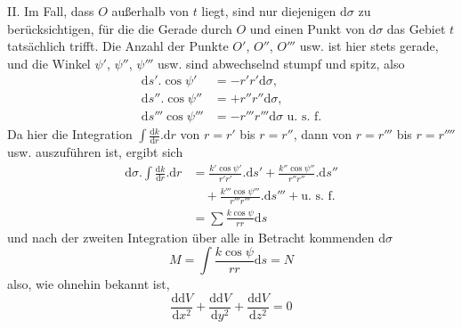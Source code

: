 II. Im Fall, dass $O$ außerhalb von $t$ liegt, sind nur diejenigen $\mathrm{d}\sigma$ zu berücksichtigen, für die die Gerade durch $O$ und einen Punkt von $\mathrm{d}\sigma$ das Gebiet $t$ tatsächlich trifft. Die Anzahl der Punkte $O'$, $O''$, $O'''$ usw. ist hier stets gerade, und die Winkel $\psi'$, $\psi''$, $\psi'''$ usw. sind abwechselnd stumpf und spitz, also
\[
\begin{aligned}
\mathrm{d}s'.\cos\psi'&=-r'r'\mathrm{d}\sigma,\\
\mathrm{d}s''.\cos\psi''&=+r''r''\mathrm{d}\sigma,\\
\mathrm{d}s'''\cos\psi'''&=-r'''r'''\mathrm{d}\sigma\text{ u. s. f.}
\end{aligned}
\]
Da hier die Integration $\int\frac{\mathrm{d}k}{\mathrm{d}r}.\mathrm{d}r$ von $r=r'$ bis $r=r''$, dann von $r=r'''$
%
bis $r=r''''$ usw. auszuführen ist, ergibt sich
\[
\begin{aligned}
\mathrm{d}\sigma.\int\frac{\mathrm{d}k}{\mathrm{d}r}.\mathrm{d}r&=\frac{k'\cos\psi'}{r'r'}.\mathrm{d}s'+\frac{k''\cos\psi''}{r''r''}.\mathrm{d}s''\\
&\quad{}+\frac{k'''\cos\psi'''}{r'''r'''}.\mathrm{d}s'''+\text{u. s. f.}\\
&=\sum\frac{k\cos\psi}{rr}\mathrm{d}s
\end{aligned}
\]
und nach der zweiten Integration über alle in Betracht kommenden $\mathrm{d}\sigma$
\[
M=\int\frac{k\cos\psi}{rr}\mathrm{d}s=N
\]
also, wie ohnehin bekannt ist,
\[
\frac{\mathrm{d}\mathrm{d}V}{\mathrm{d}x^2}+\frac{\mathrm{d}\mathrm{d}V}{\mathrm{d}y^2}+\frac{\mathrm{d}\mathrm{d}V}{\mathrm{d}z^2}=0
\]

